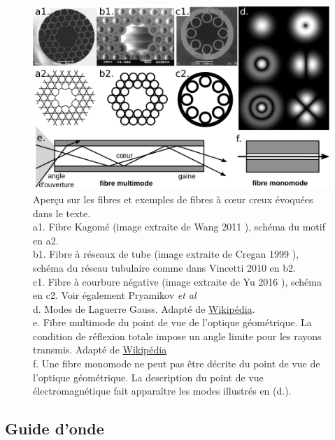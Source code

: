 \begin{figure}
    \centering
    \includegraphics[width=\textwidth]{./files/fibers.svg.png}
    \caption{Aperçu sur les fibres et exemples de fibres à cœur creux évoquées dans le texte.
    \\ a1. Fibre Kagomé (image extraite de Wang 2011 \cite{wang_low_2011}), schéma du motif en a2.
    \\ b1. Fibre à réseaux de tube (image extraite de Cregan 1999 \cite{cregan_single-mode_1999}), schéma du réseau tubulaire comme dans Vincetti 2010 \cite{vincetti_waveguiding_2010} en b2.
    \\ c1. Fibre à courbure négative (image extraite de Yu 2016 \cite{yu_negative_2016}), schéma en c2. Voir également Pryamikov \emph{et al} \cite{pryamikov_demonstration_2011}
    \\ d. Modes de Laguerre Gauss. Adapté de \href{https://en.wikipedia.org/wiki/Transverse_mode}{Wikipédia}.
    \\ e. Fibre multimode du point de vue de l'optique géométrique. La condition de réflexion totale impose un angle limite pour les rayons transmis. Adapté de \href{https://en.wikipedia.org/wiki/Optical_fiber}{Wikipédia}
    \\ f. Une fibre monomode ne peut pas être décrite du point de vue de l'optique géométrique. La description du point de vue électromagnétique fait apparaître les modes illustrés en (d.).
    \label{FIGfiberexamples}}
    \end{figure}

\subsection{Guide d'onde}

